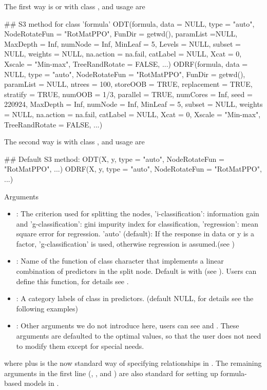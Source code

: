 \documentclass[nojss]{jss}
\numberwithin{equation}{section}
\begin{document}
The first way is  or  with class , and usage are
\begin{Code}
## S3 method for class 'formula'
ODT(formula, data = NULL, type = "auto", NodeRotateFun = "RotMatPPO",
  FunDir = getwd(), paramList =NULL, MaxDepth = Inf, numNode = Inf,
  MinLeaf = 5, Levels = NULL, subset = NULL, weights = NULL,
  na.action = na.fail, catLabel = NULL, Xcat = 0, Xscale = "Min-max",
  TreeRandRotate = FALSE, ...)
ODRF(formula, data = NULL, type = "auto", NodeRotateFun = "RotMatPPO",
  FunDir = getwd(), paramList = NULL, ntrees = 100, storeOOB = TRUE,
  replacement = TRUE, stratify = TRUE, numOOB = 1/3, parallel = TRUE,
  numCores = Inf, seed = 220924, MaxDepth = Inf, numNode = Inf,
  MinLeaf = 5, subset = NULL, weights = NULL, na.action = na.fail,
  catLabel = NULL, Xcat = 0, Xscale = "Min-max", TreeRandRotate = FALSE, ...)
\end{Code}
The second way is  with class , and usage are
\begin{Code}
## Default S3 method:
ODT(X, y, type = "auto", NodeRotateFun = "RotMatPPO", ...)
ODRF(X, y, type = "auto", NodeRotateFun = "RotMatPPO", ...)
\end{Code}
Arguments
\begin{itemize}
	\item {}: The criterion used for splitting the nodes, 'i-classification': information gain and 'g-classification': gini impurity index for classification, 'regression': mean square error for regression. 'auto' (default): If the response in data or y is a factor, 'g-classification' is used, otherwise regression is assumed.(see )
	\item {}: Name of the function of class character that implements a linear combination of predictors in the split node. Default is  with  (see ). Users can define this function, for details see .
	\item {}: A category labels of class  in predictors. (default NULL, for details see the following examples)
	\item {}: Other arguments we do not introduce here, users can see  and . These arguments are defaulted to the optimal values, so that the user does not need to modify them except for special needs.
\end{itemize}
where  plus  is the now standard way of specifying relationships in . The remaining arguments in the first line (, , and ) are also standard for setting up formula-based models in .
\end{document}

